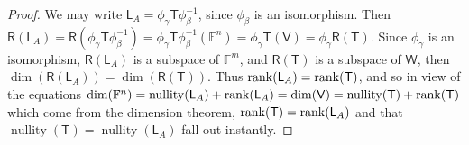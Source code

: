 \documentclass[11pt]{article}
\DeclareMathOperator{\nullity}{nullity}
\begin{document}
\begin{proof}
    We may write $\mathsf{L}_A = \phi_{\gamma}\mathsf{T}\phi_{\beta}^{-1}$, since $\phi_{\beta}$ is an isomorphism. Then $\mathsf{R}(\mathsf{L}_A) = \mathsf{R}(\phi_{\gamma}\mathsf{T}\phi_{\beta}^{-1}) = \phi_{\gamma}\mathsf{T}\phi_{\beta}^{-1}(\mathbb{F}^n) = \phi_{\gamma}\mathsf{T}(\mathsf{V}) = \phi_{\gamma}\mathsf{R}(\mathsf{T})$. Since $\phi_{\gamma}$ is an isomorphism, $\mathsf{R}(\mathsf{L}_A)$ is a subspace of $\mathbb{F}^m$, and $\mathsf{R(T)}$ is a subspace of $\mathsf{W}$, then $\dim(\mathsf{R}(\mathsf{L}_A)) = \dim(\mathsf{R(T)})$. Thus $\rank(\mathsf{L}_A)=  \rank(\mathsf{T})$, and so in view of the equations $\dim(\mathbb{F}^n) = \nullity(\mathsf{L}_A) + \rank(\mathsf{L}_A) = \dim(\mathsf{V}) = \nullity(\mathsf{T}) + \rank(\mathsf{T})$ which come from the dimension theorem, $\rank(\mathsf{T}) = \rank(\mathsf{L}_A)$ and that $\nullity(\mathsf{T}) = \nullity(\mathsf{L}_A)$ fall out instantly. 
\end{proof}
\end{document}
